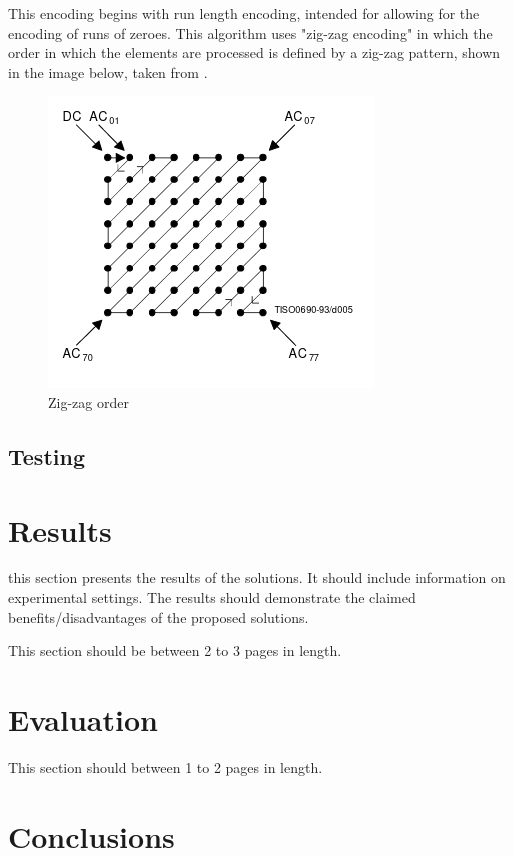 \documentclass[12pt,a4paper]{article}
\begin{document}
This encoding begins with run length encoding, intended for allowing for the encoding of runs of zeroes. This algorithm uses "zig-zag encoding" in which the order in which the elements are processed is defined by a zig-zag pattern, shown in the image below, taken from \cite{jpeg}.

\begin{figure}[H]
    \centering
    \includegraphics{zigzag.png}
    \caption{Zig-zag order}
\end{figure}

\subsection{Testing}






\newpage
\section{Results}

this section presents the results of the solutions.  It should include information on experimental settings.  The results should demonstrate the claimed benefits/disadvantages of the proposed solutions.

This section should be between 2 to 3 pages in length.
\newpage
\section{Evaluation}

This section should between 1 to 2 pages in length.
\newpage
\section{Conclusions}
\end{document}
